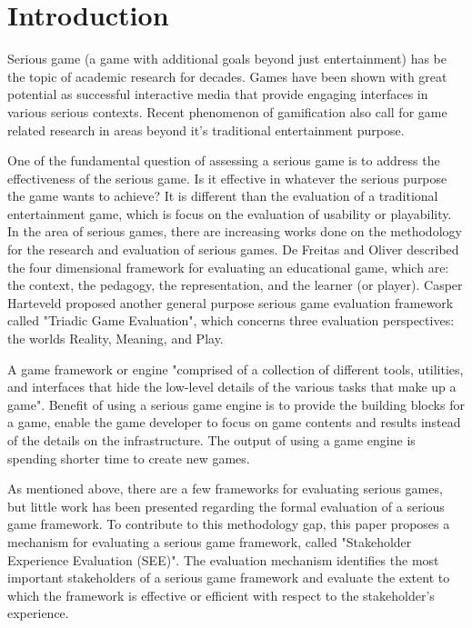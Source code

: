 \documentclass{sigchi}
\begin{document}

\section{Introduction}

Serious game (a game with additional goals beyond just entertainment) has be the topic of academic research for decades\cite{Zyda2005}. Games have been shown with great potential as successful interactive media that provide engaging interfaces in various serious contexts\cite{mcgonigal2011reality,reeves2009total}. Recent phenomenon of gamification\cite{Deterding2011mt} also call for game related research in areas beyond it's traditional entertainment purpose.

One of the fundamental question of assessing a serious game is to address the effectiveness of the serious game. Is it effective in whatever the serious purpose the game wants to achieve? It is different than the evaluation of a traditional entertainment game, which is focus on the evaluation of usability or playability\cite{song2007new}. In the area of serious games, there are increasing works done on the methodology for the research and evaluation of serious games\cite{Mayer2012233}. De Freitas and Oliver described the four dimensional framework\cite{de2006can} for evaluating an educational game, which are: the context, the pedagogy, the representation, and the learner (or player). Casper Harteveld proposed another general purpose serious game evaluation framework called "Triadic Game Evaluation"\cite{harteveld2010triadic}, which concerns three evaluation perspectives: the worlds Reality, Meaning, and Play.

A game framework or engine "comprised of a collection of different tools, utilities, and interfaces that hide the low-level details of the various tasks that make up a game"\cite{sherrod2006ultimate}. Benefit of using a serious game engine is to provide the building blocks for a game, enable the game developer to focus on game contents and results instead of the details on the infrastructure. The output of using a game engine is spending shorter time to create new games.

As mentioned above, there are a few frameworks for evaluating serious games, but little work has been presented regarding the formal evaluation of a serious game framework. To contribute to this methodology gap, this paper proposes a mechanism for evaluating a serious game framework, called "Stakeholder Experience Evaluation (SEE)". The evaluation mechanism identifies the most important stakeholders of a serious game framework and evaluate the extent to which the framework is effective or efficient with respect to the stakeholder's experience.
\end{document}
